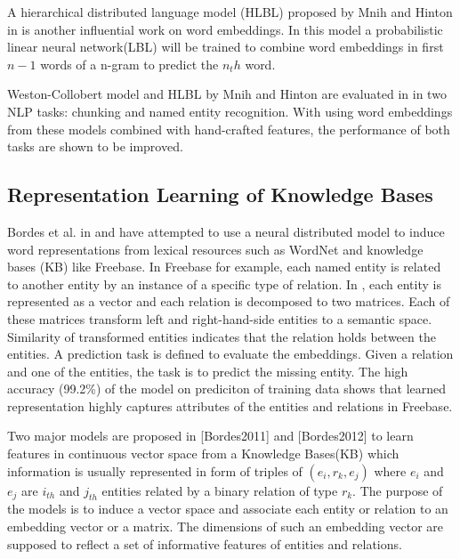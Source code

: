 A hierarchical distributed language model (HLBL) proposed by Mnih and
Hinton in \cite{Mnih2009} is another influential work on word embeddings. In
this model a probabilistic linear neural network(LBL) will be trained to 
combine word embeddings in first $n-1$ words of a n-gram to predict the $n_th$ word.

Weston-Collobert model and HLBL by Mnih and Hinton are evaluated in
\cite{Turian2010b} in two NLP tasks: chunking and named entity recognition. With
using word embeddings from these models combined with hand-crafted features, the
performance of both tasks are shown to be improved.
 
\subsection{Representation Learning of Knowledge Bases}
\label{sec: repr-learning-kb}
Bordes et al. in \cite{Bordes2011} and \cite{Bordes2012} have attempted to use
a neural distributed model to induce word representations from lexical resources
such as WordNet and knowledge bases (KB) like Freebase. In Freebase for example, each named entity is related
to another entity by an instance of a specific type of relation. In
\cite{Bordes2011}, each entity is represented as a vector and each relation is decomposed to two
matrices. Each of these matrices transform left and right-hand-side entities
to a semantic space. Similarity of transformed entities indicates that the
relation holds between the entities.  A prediction task is defined to evaluate
the embeddings. Given a relation and one of the entities, the task is to predict
the missing entity. The high accuracy (99.2\%) of the model on prediciton
of training data shows that learned representation highly captures attributes of
the entities and relations in Freebase.

Two major models are proposed in [Bordes2011] and [Bordes2012] to learn features
in continuous  vector space from a Knowledge Bases(KB) which information is
usually represented in form of triples of $(e_{i},r_{k} , e_{j} )$ where $e_{i}$ and $e_{j}$ are $i_{th}$ and $j_{th}$ entities related
 by a binary relation of type $r_{k}$. The purpose of the models is to induce a vector space and associate
  each entity or relation to an embedding vector or a matrix.
  The dimensions of such an embedding vector are supposed to reflect a set of informative features of entities and relations.
   
